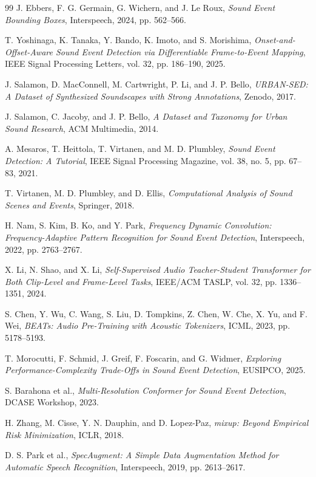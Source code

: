 \documentclass[10pt,a4paper]{article}
\begin{document}
\begin{thebibliography}{99}
J. Ebbers, F. G. Germain, G. Wichern, and J. Le Roux,
\emph{Sound Event Bounding Boxes}, Interspeech, 2024, pp. 562--566.

T. Yoshinaga, K. Tanaka, Y. Bando, K. Imoto, and S. Morishima,
\emph{Onset-and-Offset-Aware Sound Event Detection via Differentiable
Frame-to-Event Mapping}, IEEE Signal Processing Letters, vol. 32,
pp. 186--190, 2025.

J. Salamon, D. MacConnell, M. Cartwright, P. Li, and J. P. Bello,
\emph{URBAN-SED: A Dataset of Synthesized Soundscapes with Strong
Annotations}, Zenodo, 2017.

J. Salamon, C. Jacoby, and J. P. Bello,
\emph{A Dataset and Taxonomy for Urban Sound Research}, ACM Multimedia, 2014.

A. Mesaros, T. Heittola, T. Virtanen, and M. D. Plumbley,
\emph{Sound Event Detection: A Tutorial}, IEEE Signal Processing Magazine,
vol. 38, no. 5, pp. 67--83, 2021.

T. Virtanen, M. D. Plumbley, and D. Ellis,
\emph{Computational Analysis of Sound Scenes and Events}, Springer, 2018.

H. Nam, S. Kim, B. Ko, and Y. Park,
\emph{Frequency Dynamic Convolution: Frequency-Adaptive Pattern Recognition for
Sound Event Detection}, Interspeech, 2022, pp. 2763--2767.

X. Li, N. Shao, and X. Li,
\emph{Self-Supervised Audio Teacher-Student Transformer for Both Clip-Level and
Frame-Level Tasks}, IEEE/ACM TASLP, vol. 32, pp. 1336--1351, 2024.

S. Chen, Y. Wu, C. Wang, S. Liu, D. Tompkins, Z. Chen, W. Che, X. Yu, and
F. Wei,
\emph{BEATs: Audio Pre-Training with Acoustic Tokenizers}, ICML, 2023,
pp. 5178--5193.

T. Morocutti, F. Schmid, J. Greif, F. Foscarin, and G. Widmer,
\emph{Exploring Performance-Complexity Trade-Offs in Sound Event Detection},
EUSIPCO, 2025.

S. Barahona et al.,
\emph{Multi-Resolution Conformer for Sound Event Detection}, DCASE Workshop,
2023.

H. Zhang, M. Cisse, Y. N. Dauphin, and D. Lopez-Paz,
\emph{mixup: Beyond Empirical Risk Minimization}, ICLR, 2018.

D. S. Park et al.,
\emph{SpecAugment: A Simple Data Augmentation Method for Automatic Speech
Recognition}, Interspeech, 2019, pp. 2613--2617.


\end{thebibliography}
\end{document}
